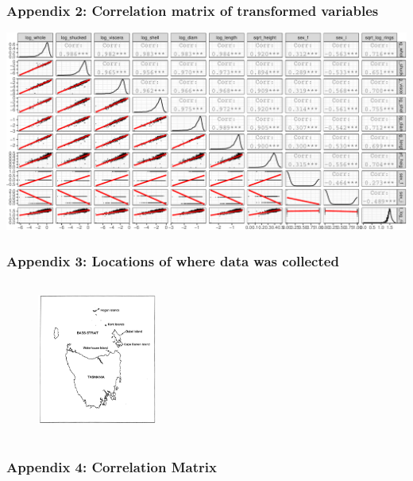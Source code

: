 \documentclass[letterpaper,9pt,twocolumn,twoside,]{pinp}
\begin{document}
\hypertarget{appendix-2-correlation-matrix-of-transformed-variables}{%
\subsubsection{Appendix 2: Correlation matrix of transformed
variables}\label{appendix-2-correlation-matrix-of-transformed-variables}}

\begin{center}\includegraphics{ExecSum_files/figure-latex/unnamed-chunk-10-1} \end{center}

\hypertarget{appendix-3-locations-of-where-data-was-collected}{%
\subsubsection{Appendix 3: Locations of where data was
collected}\label{appendix-3-locations-of-where-data-was-collected}}

\begin{figure}[H]
    \begin{center}
    \includegraphics[width=0.35\textwidth, height=2in]{Independence} 
    \end{center}
\end{figure}

\hypertarget{appendix-4-correlation-matrix}{%
\subsubsection{Appendix 4: Correlation
Matrix}\label{appendix-4-correlation-matrix}}
\end{document}
